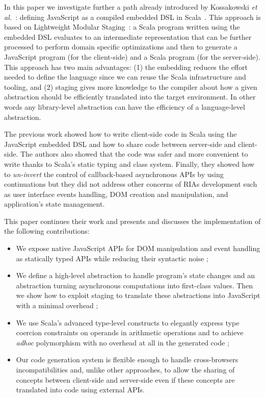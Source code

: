\documentclass[american,english,runningheads]{llncs}
\newcommand{\etal}{\emph{et al.~}}
\begin{document}
In this paper we investigate further a path already introduced by Kossakowski \etal{}: defining JavaScript as a compiled embedded DSL in Scala~\cite{Kossakowski12_JsDESL}. This approach is based on Lightweight Modular Staging~\cite{Rompf12_LMSThesis}: a Scala program written using the embedded DSL evaluates to an intermediate representation that can be further processed to perform domain specific optimizations and then to generate a JavaScript program (for the client-side) and a Scala program (for the server-side). This approach has two main advantages: (1) the embedding reduces the effort needed to define the language since we can reuse the Scala infrastructure and tooling, and (2) staging gives more knowledge to the compiler about how a given abstraction should be efficiently translated into the target environment. In other words any library-level abstraction can have the efficiency of a language-level abstraction.

The previous work showed how to write client-side code in Scala using the JavaScript embedded DSL and how to share code between server-side and client-side. The authors also showed that the code was safer and more convenient to write thanks to Scala's static typing and class system. Finally, they showed how to \emph{un-invert} the control of callback-based asynchronous APIs by using continuations but they did not address other concerns of RIAs development such as user interface events handling, DOM creation and manipulation, and application’s state management.

This paper continues their work and presents and discusses the implementation of the following contributions:

\begin{itemize}

\item We expose native JavaScript APIs for DOM manipulation and event handling as statically typed APIs while reducing their syntactic noise ;

\item We define a high-level abstraction to handle program's state changes and an abstraction turning asynchronous computations into first-class values. Then we show how to exploit staging to translate these abstractions into JavaScript with a minimal overhead ;

\item We use Scala's advanced type-level constructs to elegantly express type coercion constraints on operands in arithmetic operations and to achieve \emph{adhoc} polymorphism with no overhead at all in the generated code ;

\item Our code generation system is flexible enough to handle cross-browsers incompatibilities and, unlike other approaches, to allow the sharing of concepts between client-side and server-side even if these concepts are translated into code using external APIs.

\end{itemize}
\end{document}
